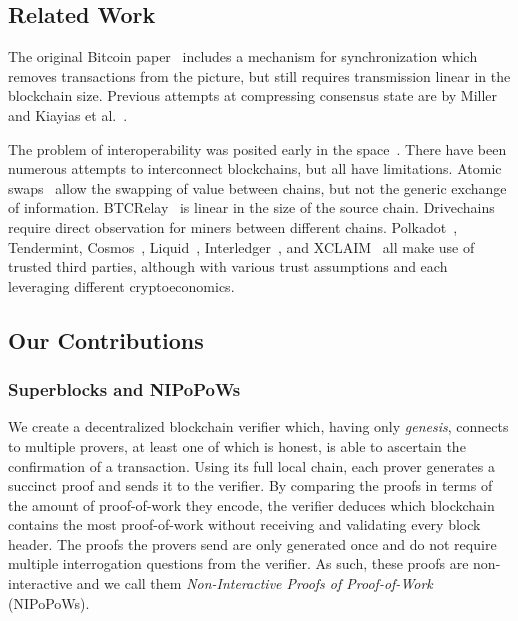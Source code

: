 \subsection{Related Work}

The original Bitcoin paper~\cite{bitcoin} includes a mechanism for synchronization
which removes transactions from the picture, but still requires transmission
linear in the blockchain size. Previous attempts at compressing consensus
state are by Miller~\cite{highway} and Kiayias et al.~\cite{popow}.

The problem of interoperability was posited early in the space~\cite{sidechains}.
There have been numerous attempts to interconnect blockchains, but all
have limitations. Atomic swaps~\cite{tiernolan,herlihy2018atomic} allow the swapping of value
between chains, but not the generic exchange of information.
BTCRelay~\cite{btcrelay} is linear in the size of the source chain.
Drivechains~\cite{drivechains} require direct observation for miners
between different chains. Polkadot~\cite{polkadot}, Tendermint, Cosmos~\cite{tendermint},
Liquid~\cite{federated-interoperability}, Interledger~\cite{interledger},
and XCLAIM~\cite{xclaim} all make use of trusted third parties, although with various
trust assumptions and each leveraging different cryptoeconomics.

\subsection{Our Contributions}

\subsubsection{Superblocks and NIPoPoWs}

We create a decentralized blockchain verifier which, having only
\emph{genesis}, connects to multiple provers, at least one of which is honest,
is able to ascertain the confirmation of a transaction. Using its full local
chain, each prover generates a succinct proof and sends it to the verifier.
By comparing the
proofs in terms of the amount of proof-of-work they encode, the verifier deduces
which blockchain contains the most proof-of-work without receiving and
validating every block header. The proofs the provers send are only generated
once and do not require multiple interrogation questions from the verifier. As
such, these proofs are non-interactive and we call them \emph{Non-Interactive
Proofs of Proof-of-Work} (NIPoPoWs).

